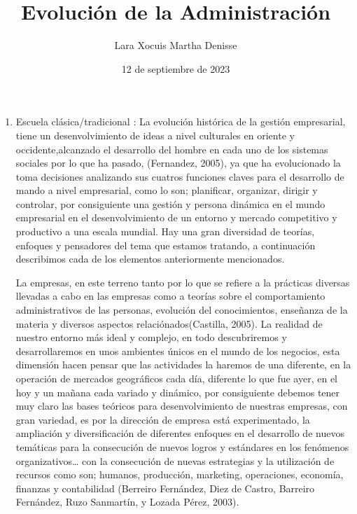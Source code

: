 \documentclass[letterpaper,12pt]{article}
\title {\textbf{Evolución de la Administración}}
\author{Lara Xocuis Martha Denisse}
\date{12 de septiembre de 2023}
\begin{document}
\maketitle

\begin{sloppypar}
\begin{enumerate}
    \item Escuela clásica/tradicional : La evolución histórica de la gestión empresarial, tiene un desenvolvimiento de ideas a nivel culturales en oriente y occidente,alcanzado el desarrollo del hombre en cada uno de los sistemas sociales por lo que ha pasado, (Fernandez, 2005), ya que ha evolucionado la toma decisiones analizando sus cuatros funciones claves para el desarrollo de mando a nivel empresarial, como lo son; planificar, organizar, dirigir y controlar, por consiguiente una gestión y persona dinámica en el mundo empresarial en el desenvolvimiento de un entorno y mercado competitivo y productivo a una escala mundial. Hay una gran diversidad de teorías, enfoques y pensadores del tema que estamos tratando, a continuación describimos cada de los elementos anteriormente mencionados.

    La empresas, en este terreno tanto por lo que se refiere a la prácticas diversas llevadas a cabo en las empresas como a teorías sobre el comportamiento administrativos de las personas, evolución del conocimientos, enseñanza de la materia y diversos aspectos relaciónados(Castilla, 2005). La realidad de nuestro entorno más ideal y complejo, en todo descubriremos y desarrollaremos en unos ambientes únicos en el mundo de los negocios, esta dimensión hacen pensar que las actividades la haremos de una diferente, en la operación de mercados geográficos cada día, diferente lo que fue ayer, en el hoy y un mañana cada variado y dinámico, por consiguiente debemos tener muy claro las bases teóricos para desenvolvimiento de nuestras empresas, con gran variedad, es por la dirección de empresa está experimentado, la ampliación y diversificación de diferentes enfoques en el desarrollo de nuevos temáticas para la consecución de nuevos logros y estándares en los fenómenos organizativos… con la consecución de nuevas estrategias y la utilización de recursos como son; humanos, producción, marketing, operaciones, economía, finanzas y contabilidad (Berreiro Fernández, Diez de Castro, Barreiro Fernández, Ruzo Sanmartín, y Lozada Pérez, 2003).



\end{enumerate}
\end{sloppypar}
\end{document}

